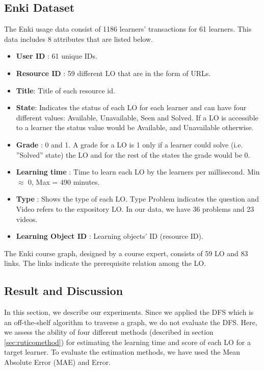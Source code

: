 \documentclass{sig-alternate}
\begin{document}
\newpage
\subsection{Enki Dataset}
\label{subsec:enkidataset}
\noindent The Enki usage data consist of 1186 learners’ transactions for 61 learners. This data includes 8 attributes that are listed below.

\begin{itemize}[noitemsep]
\item \textbf{User ID} : 61 unique IDs.
\item \textbf{Resource ID} : 59 different LO that are in the form of URLs.
\item \textbf{Title}: Title of each resource id.
\item \textbf{State}: Indicates the status of each LO for each learner and can have four different values: Available, Unavailable, Seen and Solved. If a LO is accessible to a learner the status value would be Available, and Unavailable otherwise.
\item \textbf{Grade} : 0 and 1. A grade for a LO is 1 only if a learner could solve (i.e. ”Solved” state) the LO and for the rest of the states the grade would be 0.
\item \textbf{Learning time} : Time to learn each LO by the learners per millisecond. Min $\approx$ 0, Max = 490 minutes.
\item \textbf{Type} : Shows the type of each LO. Type Problem indicates the question and Video refers to the expository LO. In our data, we have 36 problems and 23 videos.
\item \textbf{Learning Object ID} : Learning objects’ ID (resource ID).
\end{itemize}

The Enki course graph, designed by a course expert, consists of 59 LO and 83 links. The links indicate the prerequisite relation among the LO.

\subsection{Result and Discussion}
\label{subsec:resultanddiscussion}
\noindent In this section, we describe our experiments. Since we applied the DFS which is an off-the-shelf algorithm to traverse a graph, we do not evaluate the DFS. Here, we assess the ability of four different methods (described in section \ref{sec:ruticomethod}) for estimating the learning time and score of each LO for a target learner. To evaluate the estimation methods, we have used the Mean Absolute Error (MAE) and Error.
\end{document}

